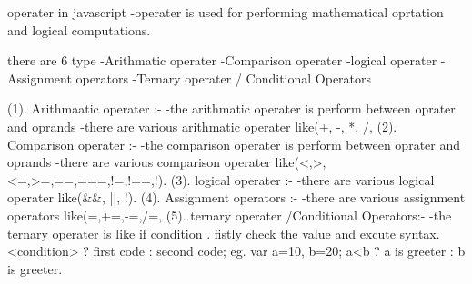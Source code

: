 operater in javascript
    -operater is used for performing mathematical oprtation and logical computations.

    there  are 6 type
        -Arithmatic operater
        -Comparison  operater
        -logical operater
        -Assignment operators
        -Ternary operater / Conditional Operators

    (1). Arithmaatic operater :-
                -the arithmatic operater is perform between oprater and oprands
            -there are various arithmatic operater like(+, -, *, /, %
    (2). Comparison  operater :-
                -the comparison operater is perform between oprater and oprands
                -there are various comparison operater like(<,>,<=,>=,==,===,!=,!==,!).
    (3). logical operater :-
                -there are various logical operater like(&&, ||, !).
    (4). Assignment operators :-
                 -there are various assignment operators like(=,+=,-=,/=,%
    (5). ternary operater /Conditional Operators:-
                -the ternary operater is  like if condition . fistly check the value and excute 
                syntax. <condition> ? first code : second code;
                eg. var a=10, b=20;
                    a<b ? a is greeter : b is greeter.
                    




